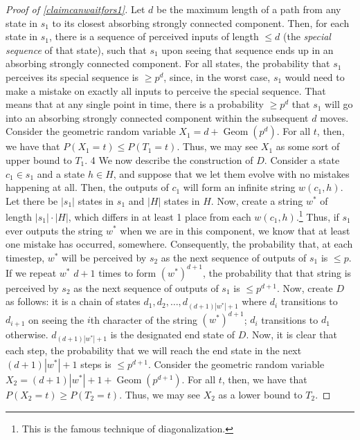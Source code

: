 \documentclass[11pt]{amsart}
\theoremstyle{definition}
\theoremstyle{remark}
\begin{document}
\begin{proof}[Proof of \cref{claimcanwaitfors1}]
        Let $d$ be the maximum length of a path from any state in $s_1$ to its closest absorbing strongly connected component. Then, for each state in $s_1$, there is a sequence of perceived inputs of length $\leq d$ (the \textit{special sequence} of that state), such that $s_1$ upon seeing that sequence ends up in an absorbing strongly connected component. For all states, the probability that $s_1$ 
        perceives its special sequence is $\geq p^d$, since, in the worst case, $s_1$ would need to make a mistake on exactly all 
        inputs to perceive the special sequence. That means that at any single point in time, there is a probability $\geq p^d$ that $s_1$ 
        will go into an absorbing strongly connected component within the subsequent $d$ moves. Consider the geometric random variable $X_1 = d + \operatorname{Geom} (p^d)$. For all $t$, then, we have that $P(X_1 = t) \leq P(T_1 = t)$. Thus, we may see $X_1$ as some sort of upper bound to $T_1$.
4
        We now describe the construction of $D$. Consider a state $c_1 \in s_1$ and a state $h \in H$, and suppose that we let them evolve with no mistakes happening at all. Then, the outputs of $c_1$ will form an infinite string $w(c_1, h)$. Let there be $|s_1|$ states in $s_1$ and $|H|$ states in $H$. Now, create a string $w^*$ of length $|s_1| \cdot |H|$, which differs in at least 1 place from each $w(c_1,h)$.\footnote{This is the famous technique of diagonalization.} Thus, if $s_1$ ever outputs the string $w^*$ when we are in this component, we know that at least one mistake has occurred, somewhere. Consequently, the probability that, at each timestep, $w^*$ will be perceived by $s_2$ as the next sequence of outputs of $s_1$ is $\leq p$. 
        If we repeat $w^*$ $d+1$ times to form $(w^*)^{d+1}$, the probability that that string is perceived by $s_2$ as the next sequence of outputs of $s_1$ is $\leq p^{d+1}$.
        Now, create $D$ as follows: it is a chain of states $d_1,d_2,\ldots,d_{(d+1)|w^*|+1}$ where $d_i$ transitions to $d_{i+1}$ on seeing the $i$th character of the string $(w^*)^{d+1}$; $d_i$ transitions to $d_1$ otherwise. $d_{(d+1)|w^*|+1}$ is the designated end state of $D$. Now, it is clear that each step, the probability that we will reach the end state in the next $(d+1)|w^*|+1$ steps is $\leq p^{d+1}$. Consider the geometric random variable $X_2 = (d+1)|w^*| + 1 + \operatorname{Geom} (p^{d+1})$. For all $t$, then, we have that $P(X_2 = t) \geq P(T_2 = t)$. Thus, we may see $X_2$ as a lower bound to $T_2$.


\end{proof}
\end{document}
